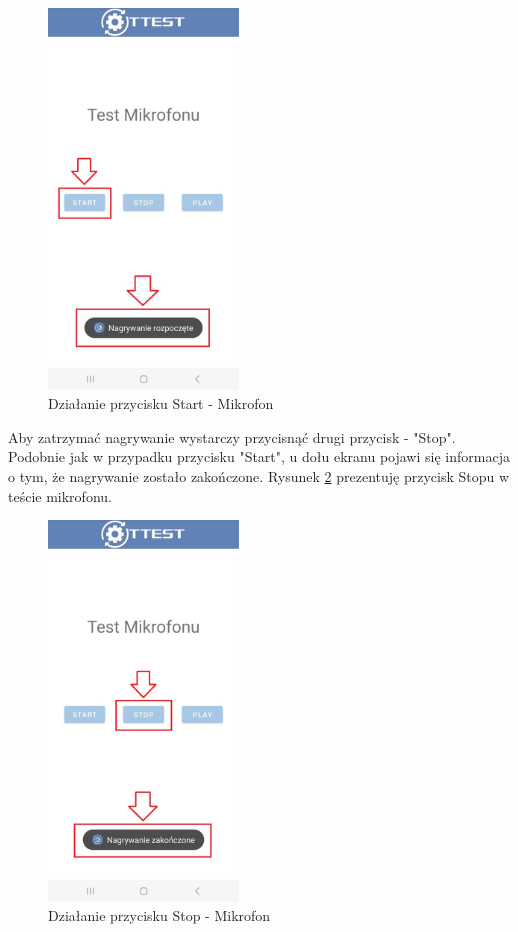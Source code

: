 \begin{figure}[!hbt]
	\begin{center}
		\includegraphics[angle=360, width=0.45\textwidth]{rys/punkt6/mikrofon1}
		\caption{Działanie przycisku Start - Mikrofon}
		\label{rys:mikrofon1}
	\end{center}
\end{figure}

\newpage


Aby zatrzymać nagrywanie wystarczy przycisnąć drugi przycisk - "Stop". Podobnie jak w przypadku przycisku "Start", u dołu ekranu pojawi się informacja o tym, że nagrywanie zostało zakończone. Rysunek \ref{rys:mikrofon2} prezentuję przycisk Stopu w teście mikrofonu.

\begin{figure}[!hbt]
	\begin{center}
		\includegraphics[angle=360, width=0.45\textwidth]{rys/punkt6/mikrofon2}
		\caption{Działanie przycisku Stop - Mikrofon}
		\label{rys:mikrofon2}
	\end{center}
\end{figure}

